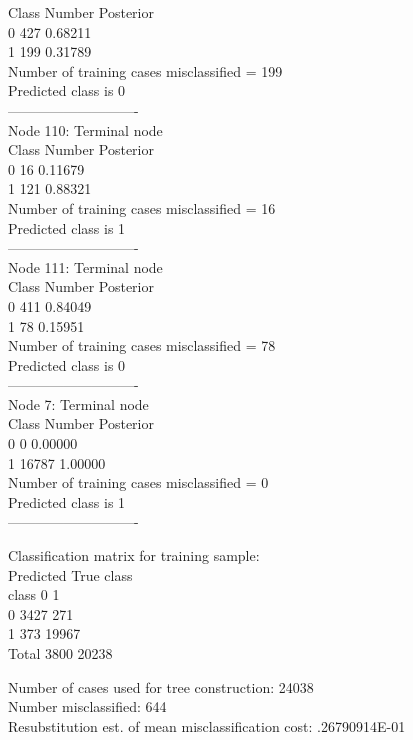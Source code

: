 \documentclass[12pt]{article}
\begin{document}
 Class      Number   Posterior\\
 0             427     0.68211\\
 1             199     0.31789\\
 Number of training cases misclassified = 199\\
 Predicted class is 0\\
 ----------------------------\\
Node 110: Terminal node\\
 Class      Number   Posterior\\
 0              16     0.11679\\
 1             121     0.88321\\
 Number of training cases misclassified = 16\\
 Predicted class is 1\\
 ----------------------------\\
Node 111: Terminal node\\
 Class      Number   Posterior\\
 0             411     0.84049\\
 1              78     0.15951\\
 Number of training cases misclassified = 78\\
 Predicted class is 0\\
 ----------------------------\\
Node 7: Terminal node\\
 Class      Number   Posterior\\
 0               0     0.00000\\
 1           16787     1.00000\\
 Number of training cases misclassified = 0\\
 Predicted class is 1\\
 ----------------------------
  
 
 Classification matrix for training sample:\\
 Predicted      True class\\
 class              0         1\\
 0               3427       271\\
 1                373     19967\\
 Total           3800     20238
 
 Number of cases used for tree construction: 24038\\
 Number misclassified: 644\\
 Resubstitution est. of mean misclassification cost: .26790914E-01
 
\end{document}
